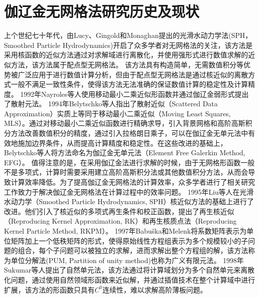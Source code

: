 \section{伽辽金无网格法研究历史及现状}
上个世纪七十年代，由Lucy\textsuperscript{\cite{1977A}}、Gingold和Monaghan\textsuperscript{\cite{gingold1977}}提出的光滑水动力学法(SPH，Smoothed Particle Hydrodynamics)开启了众多学者对无网格法的关注，该方法是采用核函数的近似方法通过对求解域进行离散化，并使用强形式进行数值求解的近似方法，该方法属于配点型无网格法。
该方法具有构造简单，无需数值积分等优势被广泛应用于进行数值计算分析，但由于配点型无网格法是通过核近似的离散方式一般不满足一致性条件，使得该方法无法准确的保证数值计算的稳定性及计算精度\textsuperscript{\cite{auricchio2010a,wang2018a,wang2020,gomez2016}}。
1992年Nayroles等人\textsuperscript{\cite{nayroles1992}}使用移动最小二乘近似形函数并通过伽辽金弱形式提出了散射元法。
1994年Belytschko等人\textsuperscript{\cite{belytschko1994}}指出了散射近似（Scattered Data Approximation）实质上等同于移动最小二乘近似（Moving Least Squares, MLS）。通过对移动最小二乘近似函数进行精确求导，引入背景网格和高阶高斯积分方法改善数值积分的精度，通过引入拉格朗日乘子，可以在伽辽金无单元法中有效地施加边界条件，从而提高计算精度和稳定性。在这些改进的基础上，Belytschko等人将方法命名为伽辽金无单元法（Element Free Galerkin Method, EFG）。
值得注意的是，在采用伽辽金法进行求解的时候，由于无网格形函数一般不是多项式，计算时需要采用建立高阶高斯积分法或其他数值积分方法\textsuperscript{\cite{de2001,carpinteri2002,WangBingBing2019}}，从而会导致计算效率降低\textsuperscript{\cite{melenk1996,WuJunChao}}。为了提高伽辽金无网格法的计算效率，众多学者进行了相关研究工作致力于解决伽辽金无网格法在计算过程中的效率问题\textsuperscript{\cite{wang2016,wang2019,chen2001,chen2013,duan2012,duan2014}}。
1995年Liu等人\textsuperscript{\cite{liu1995}}在光滑水动力学（Smoothed Particle Hydrodynamics, SPH）核近似方法的基础上进行了改进。他们引入了核近似的多项式再生条件和校正函数，提出了再生核近似（Reproducing Kernel Approximation, RK）和再生核质点法（Reproducing Kernel Particle Method, RKPM）。
1997年Babuška和Melenk\textsuperscript{\cite{melenk1996,babuska1997}}将系数矩阵表示为单位矩阵加上一个低秩矩阵的形式，使得原始线性方程组表示为多个规模较小的子问题的组合，每个子问题可以被独立的求解，进而求解出整个方程组的解，该方法称为单位分解法(PUM, Partition of unity method)也称为广义有限元法\textsuperscript{\cite{strouboulis2001}}。
1998年Sukumar等人\textsuperscript{\cite{sukumar1998}}提出了自然单元法，该方法通过将计算域划分为多个自然单元来离散化问题，通过使用自然领域形函数来近似解，并通过插值技术在整个计算域中进行扩展，该方法的形函数只具有$C^0$连续性，难以求解高阶薄板问题。
